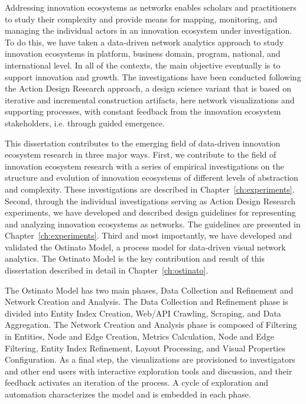 Addressing innovation ecosystems as networks enables scholars and practitioners to study their complexity and provide means for mapping, monitoring, and managing the individual actors in an innovation ecosystem under investigation. To do this, we have taken a data-driven network analytics approach to study innovation ecosystems in platform, business domain, program, national, and international level. In all of the contexts, the main objective eventually is to support innovation and growth. The investigations have been conducted following the Action Design Research approach, a design science variant that is based on iterative and incremental construction artifacts, here network visualizations and supporting processes, with constant feedback from the innovation ecosystem stakeholders, i.e. through guided emergence.

This dissertation contributes to the emerging field of data-driven innovation ecosystem research in three major ways. First, we contribute to the field of innovation ecosystem research with a series of empirical investigations on the structure and evolution of innovation ecosystems of different levels of abstraction and complexity. These investigations are described in Chapter~\ref{ch:experiments}. Second, through the individual investigations serving as Action Design Research experiments, we have developed and described design guidelines for representing and analyzing innovation ecosystems as networks. The guidelines are presented in Chapter~\ref{ch:experiments}. Third and most importantly, we have developed and validated the Ostinato Model, a process model for data-driven visual network analytics. The Ostinato Model is the key contribution and result of this dissertation described in detail in Chapter~\ref{ch:ostinato}.

The Ostinato Model has two main phases, Data Collection and Refinement and Network Creation and Analysis. The Data Collection and Refinement phase is divided into Entity Index Creation, Web/API Crawling, Scraping, and Data Aggregation. The Network Creation and Analysis phase is composed of Filtering in Entities, Node and Edge Creation, Metrics Calculation, Node and Edge Filtering, Entity Index Refinement, Layout Processing, and Visual Properties Configuration. As a final step, the visualizations are provisioned to investigators and other end users with interactive exploration tools and discussion, and their feedback activates an iteration of the process. A cycle of exploration and automation characterizes the model and is embedded in each phase.

